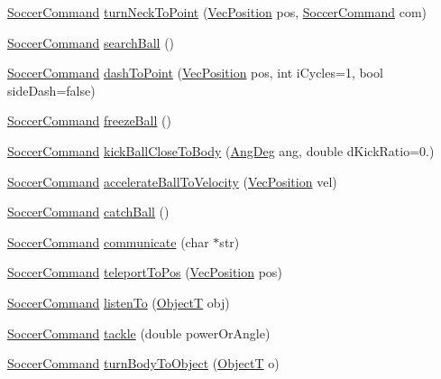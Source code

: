 \begin{DoxyCompactItemize}
\item 
\hyperlink{classSoccerCommand}{Soccer\+Command} \hyperlink{classBasicPlayer_a651d2599323445ef450bd9af94c5c7ca}{turn\+Neck\+To\+Point} (\hyperlink{classVecPosition}{Vec\+Position} pos, \hyperlink{classSoccerCommand}{Soccer\+Command} com)
\item 
\hyperlink{classSoccerCommand}{Soccer\+Command} \hyperlink{classBasicPlayer_ad9700140b78ffeb1794366cf63836e21}{search\+Ball} ()
\item 
\hyperlink{classSoccerCommand}{Soccer\+Command} \hyperlink{classBasicPlayer_af7da70e5ce312ed3e4365531f050195f}{dash\+To\+Point} (\hyperlink{classVecPosition}{Vec\+Position} pos, int i\+Cycles=1, bool side\+Dash=false)
\item 
\hyperlink{classSoccerCommand}{Soccer\+Command} \hyperlink{classBasicPlayer_a6edbb52467b3952693bc5e86d6230473}{freeze\+Ball} ()
\item 
\hyperlink{classSoccerCommand}{Soccer\+Command} \hyperlink{classBasicPlayer_a517b7d4ef489a3476662939019e1d66d}{kick\+Ball\+Close\+To\+Body} (\hyperlink{Geometry_8h_a6bfe02ae9bb185092902092561ab2865}{Ang\+Deg} ang, double d\+Kick\+Ratio=0.)
\item 
\hyperlink{classSoccerCommand}{Soccer\+Command} \hyperlink{classBasicPlayer_a3ebbd9fae54ebdca287d1c7aa2ce8b25}{accelerate\+Ball\+To\+Velocity} (\hyperlink{classVecPosition}{Vec\+Position} vel)
\item 
\hyperlink{classSoccerCommand}{Soccer\+Command} \hyperlink{classBasicPlayer_a61de8901846464425f2670dc4f976ab0}{catch\+Ball} ()
\item 
\hyperlink{classSoccerCommand}{Soccer\+Command} \hyperlink{classBasicPlayer_a22df9c1f41ddd210ffc6d97e56a2b904}{communicate} (char $\ast$str)
\item 
\hyperlink{classSoccerCommand}{Soccer\+Command} \hyperlink{classBasicPlayer_a22ffa701a6b2da41c70b60a8c244d96d}{teleport\+To\+Pos} (\hyperlink{classVecPosition}{Vec\+Position} pos)
\item 
\hyperlink{classSoccerCommand}{Soccer\+Command} \hyperlink{classBasicPlayer_a4e9844c2ef6e7c53c604835c9423638a}{listen\+To} (\hyperlink{SoccerTypes_8h_ad4b701fa66e7d26c054ed15b7820c77c}{ObjectT} obj)
\item 
\hyperlink{classSoccerCommand}{Soccer\+Command} \hyperlink{classBasicPlayer_a987d8442964607644adf5bcd539a0659}{tackle} (double power\+Or\+Angle)
\item 
\hyperlink{classSoccerCommand}{Soccer\+Command} \hyperlink{classBasicPlayer_a9374629af78e897891ab992a21f85f2a}{turn\+Body\+To\+Object} (\hyperlink{SoccerTypes_8h_ad4b701fa66e7d26c054ed15b7820c77c}{ObjectT} o)

\end{DoxyCompactItemize}
